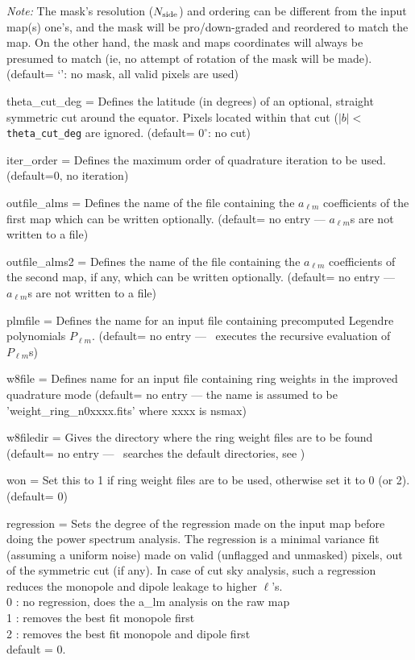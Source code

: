 \begin{qualifiers}
\begin{qulist}{}
{\em Note:} The mask's resolution ($N_{\mathrm{side}}$) and ordering can be different from the input map(s)
one's, and the mask will be pro/down-graded and reordered to match the map. On the
other hand, the mask and maps coordinates will always be presumed to match (ie, no
attempt of rotation of the mask will be made).
(default= `': no mask, all valid pixels are used)
 \item[{theta\_cut\_deg = }]%
 Defines the latitude (in degrees) of 
an optional, straight symmetric cut around the equator.  Pixels located within
that cut ($|b|<${\tt theta\_cut\_deg} are ignored.
(default= $0^\circ$: no cut)
 \item[{iter\_order = }]%
 Defines the maximum order of quadrature 
iteration to be used. (default=0, no iteration)
 \item[{outfile\_alms = }]%
 Defines the name of the file 
containing the $a_{\ell m}$  coefficients of the first map
which can be written optionally.   (default= no entry ---
$a_{\ell m}$s are not written to a file)
 \item[{outfile\_alms2 = }]%
 Defines the name of the file 
containing the $a_{\ell m}$  coefficients of the second map, if any,
which can be written optionally.   (default= no entry ---
$a_{\ell m}$s are not written to a file)
 \item[{plmfile = }]%
 Defines the name for an input file
    containing  precomputed Legendre polynomials $P_{\ell m}$.
(default= no entry --- \thedocid\ executes the recursive evaluation 
of $P_{\ell m}$s)
\item[{w8file = }]%
 Defines name for an input file containing ring
  weights in the improved quadrature mode (default= no entry ---
the name is assumed to be 'weight\_ring\_n0xxxx.fits' where xxxx is nsmax)
\item[{w8filedir = }]%
 Gives the directory where the ring weight files are
to be found (default= no entry --- \thedocid\ searches the default
directories, see )
\item[{won = }]%
 Set this to 1 if ring weight files are to be used,
otherwise set it to 0 (or 2). (default= 0)
\item[{regression = }]%
 {{Sets the degree of the regression made on the
input map before doing the power spectrum analysis. 
The regression is a minimal variance fit (assuming a uniform noise) 
made on valid (unflagged and unmasked) pixels, out of the symmetric cut (if
any). In case of cut sky analysis, such a regression reduces the monopole
and dipole leakage to higher $\ell$'s.\\
0 : no regression, does the a\_lm analysis on the raw map\\
1 : removes the best fit monopole first\\
2 : removes the best fit monopole and dipole first\\
default = 0.}}
 

\end{qulist}
\end{qualifiers}
